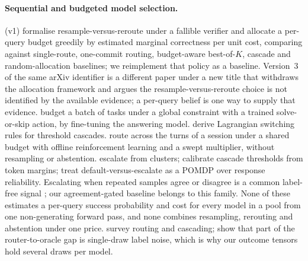 \documentclass[10pt]{article} %
\begin{document}
\paragraph{Sequential and budgeted model selection.}
\citet{chen2026ror} (v1) formalise resample-versus-reroute under a fallible verifier and allocate
a per-query budget greedily by estimated marginal correctness per unit cost, comparing against
single-route, one-commit routing, budget-aware best-of-$K$, cascade and random-allocation
baselines; we reimplement that policy as a baseline.  Version~3 of the same arXiv identifier
\citep{chen2026rorv3} is a different paper under a new title that withdraws the allocation
framework and argues the resample-versus-reroute choice is not identified by the available
evidence; a per-query belief is one way to supply that evidence.  \citet{zhao2026roi} budget a
batch of tasks under a global constraint with a trained solve-or-skip action, by fine-tuning the
answering model.  \citet{bouchard2026escalation} derive Lagrangian switching rules for threshold
cascades.  \citet{seqroute2026} route across the turns of a session under a shared budget with
offline reinforcement learning and a swept multiplier, without resampling or abstention.
\citet{clusterescalate2026} escalate from clusters; \citet{ucci2026} calibrate cascade thresholds
from token margins; \citet{beliefguided2026} treat default-versus-escalate as a POMDP over
response reliability.  Escalating when repeated samples agree or disagree is a common label-free
signal \citep{automix2024,semanticagreement2025}; our agreement-gated baseline belongs to this
family.  None of these estimates a per-query success probability and cost for every model in a
pool from one non-generating forward pass, and none combines resampling, rerouting and abstention
under one price.  \citet{routingsurvey2026} survey routing and cascading; \citet{routinggap2026}
show that part of the router-to-oracle gap is single-draw label noise, which is why our outcome
tensors hold several draws per model.
\end{document}
